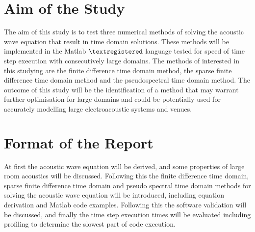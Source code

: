 \section{Aim of the Study}

The aim of this study is to test three numerical methods of solving the acoustic wave equation that result in time domain solutions. These methods will be implemented in the Matlab $\textregistered $ language tested for speed of time step execution with consecutively large domains. The methods of interested in this studying are the finite difference time domain method, the sparse finite difference time domain method and the pseudospectral time domain method. The outcome of this study will be the identification of a method that may warrant further optimisation for large domains and could be potentially used for accurately modelling large electroacoustic systems and venues.\\

\section{Format of the Report}
At first the acoustic wave equation will be derived, and some properties of large room acoustics will be discussed. Following this the finite difference time domain, sparse finite difference time domain and pseudo spectral time domain methods for solving the acoustic wave equation will be introduced, including equation derivation and Matlab code examples. Following this the software validation will be discussed, and finally the time step execution times will be evaluated including profiling to determine the slowest part of code execution.\\

